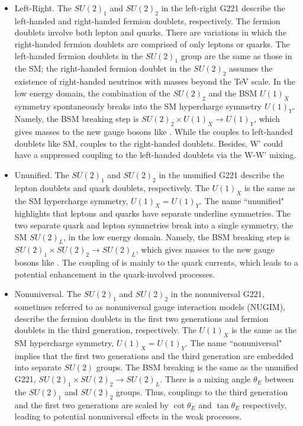 \begin{itemize}
    \item Left-Right. The $SU(2)_1$ and $SU(2)_2$ in the left-right G221 describe the left-handed and right-handed fermion doublets, respectively. The fermion doublets involve both lepton and quarks. There are variations in which the right-handed fermion doublets are comprised of only leptons or quarks. The left-handed fermion doublets in the $SU(2)_1$ group are the same as those in the SM; the right-handed fermion doublet in the $SU(2)_2$ assumes the existence of right-handed neutrinos with masses beyond the TeV scale. In the low energy domain, the combination of the $SU(2)_2$ and the BSM $U(1)_X$ symmetry spontaneously breaks into the SM hypercharge symmetry $U(1)_Y$. Namely, the BSM breaking step is $SU(2)_2 \times U(1)_X  \to U(1)_Y$, which gives masses to the new gauge bosons like \PWpr. While the \PW couples to left-handed doublets like SM, \PWpr couples to the right-handed doublets. Besides, W' could have a suppressed coupling to the left-handed doublets via the W-W' mixing. 
    
    \item Ununified. The $SU(2)_1$ and $SU(2)_2$ in the ununified G221 describe the lepton doublets and quark doublets, respectively. The $U(1)_X$ is the same as the SM hypercharge symmetry,  $U(1)_X=U(1)_Y$. The name ``ununified" highlights that leptons and quarks have separate underline symmetries. The two separate quark and lepton symmetries break into a single symmetry, the SM $SU(2)_L$, in the low energy domain. Namely, the BSM breaking step is $SU(2)_1 \times SU(2)_2 \to SU(2)_L$, which gives masses to the new gauge bosons like \PWpr. The coupling of \PWpr is mainly to the quark currents, which leads to a potential enhancement in the quark-involved processes.

    \item Nonuniversal. The $SU(2)_1$ and $SU(2)_2$ in the nonuniversal G221, sometimes referred to as nonuniversal gauge interaction models (NUGIM), describe the fermion doublets in the first two generations and fermion doublets in the third generation, respectively. The $U(1)_X$ is the same as the SM hypercharge symmetry,  $U(1)_X=U(1)_Y$. The name ``nonuniversal" implies that the first two generations and the third generation are embedded into separate $SU(2)$ groups. The BSM breaking is the same as the ununified G221, $SU(2)_1 \times SU(2)_2 \to SU(2)_L$. There is a mixing angle $\theta_E$ between the $SU(2)_1$ and $SU(2)_2$ groups. Thus, \PWpr couplings to the third generation and the first two generations are scaled by $\cot \theta_E$ and $\tan \theta_E$ respectively, leading to potential nonuniversal effects in the weak processes.
\end{itemize}




